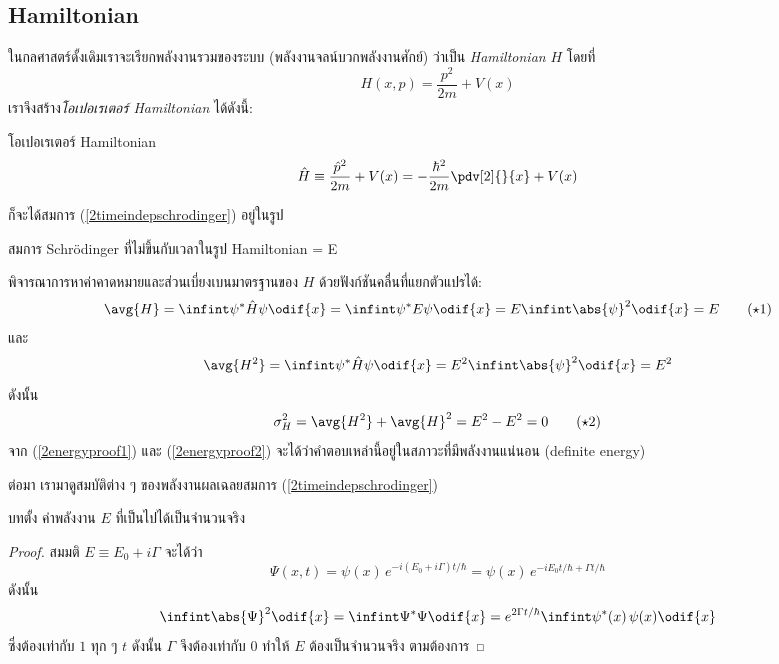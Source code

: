 \subsection{Hamiltonian}

ในกลศาสตร์ดั้งเดิมเราจะเรียกพลังงานรวมของระบบ (พลังงานจลน์บวกพลังงานศักย์) ว่าเป็น \emph{Hamiltonian} $H$ โดยที่
\[
H(x, p) = \frac{p^2}{2m} + V(x)
\]
เราจึงสร้าง\emph{โอเปอเรเตอร์ Hamiltonian} ได้ดังนี้:
\begin{defbox}{โอเปอเรเตอร์ Hamiltonian}
    \begin{equation}
        \hat{H} \equiv \frac{\hat{p}^2}{2m} + V(x) = -\frac{\hbar^2}{2m}\pdv[2]{}{x} + V(x)
    \end{equation}
\end{defbox}
ก็จะได้สมการ (\ref{2timeindepschrodinger}) อยู่ในรูป
\begin{eqbox}{สมการ Schrödinger ที่ไม่ขึ้นกับเวลาในรูป Hamiltonian}
    \psi = E\psi
\end{eqbox}

พิจารณาการหาค่าคาดหมายและส่วนเบี่ยงเบนมาตรฐานของ $H$ ด้วยฟังก์ชันคลื่นที่แยกตัวแปรได้:
\begin{equation}
    \avg{H} = \infint \psi^*\hat{H}\psi\odif{x} = \infint \psi^* E\psi\odif{x} = E \infint \abs{\psi}^2 \odif{x} = E\tag{$\star$1}\label{2energyproof1}
\end{equation}
และ
\[
\avg{H^2} = \infint \psi^*\hat{H}\psi\odif{x} = E^2\infint\abs{\psi}^2\odif{x} = E^2
\]
ดังนั้น
\begin{equation}
    \sigma_H^2 = \avg{H^2} + \avg{H}^2 = E^2 - E^2 = 0\tag{$\star$2}\label{2energyproof2}
\end{equation}
จาก (\ref{2energyproof1}) และ (\ref{2energyproof2}) จะได้ว่าคำตอบเหล่านี้อยู่ในสภาวะที่มีพลังงานแน่นอน (definite energy)

ต่อมา เรามาดูสมบัติต่าง ๆ ของพลังงานผลเฉลยสมการ (\ref{2timeindepschrodinger})

\begin{corbox}{บทตั้ง}
    ค่าพลังงาน $E$ ที่เป็นไปได้เป็นจำนวนจริง
\end{corbox}
\begin{proof}
    สมมติ $E \equiv E_0 + i\Gamma$ จะได้ว่า
    \[
    \Psi(x, t) = \psi(x)\,e^{-i(E_0 + i\Gamma)t/\hbar} = \psi(x)\,e^{-iE_0t/\hbar + \Gamma t/\hbar}
    \]
    ดังนั้น
    \[
    \infint \abs{\Psi}^2\odif{x} = \infint \Psi^*\Psi\odif{x} = e^{2\Gamma t/\hbar}\infint \psi^*(x)\,\psi(x)\odif{x}
    \]
    ซึ่งต้องเท่ากับ $1$ ทุก ๆ $t$ ดังนั้น $\Gamma$ จึงต้องเท่ากับ $0$ ทำให้ $E$ ต้องเป็นจำนวนจริง ตามต้องการ
\end{proof}

